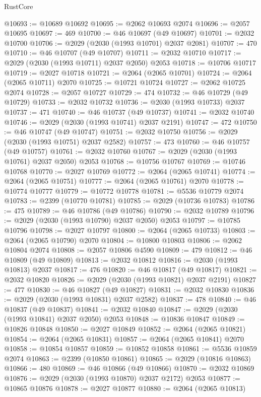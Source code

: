 \begin{lexlean}{RustCore}
\begin{coremodule}
@10693 := @10689 @10692
@10695 := @2062 @10693 @2074
@10696 := @2057 @10695
@10697 := 469
@10700 := @46 @10697 (@49 @10697)
@10701 := @2032 @10700
@10706 := @2029 (@2030 (@1993 @10701) @2037 @2081)
@10707 := 470
@10710 := @46 @10707 (@49 @10707)
@10711 := @2032 @10710
@10717 := @2029 (@2030 (@1993 @10711) @2037 @2050) @2053
@10718 := @10706 @10717
@10719 := @2027 @10718
@10721 := @2064 (@2065 @10701)
@10724 := @2064 (@2065 @10711) @2070
@10725 := @10721 @10724
@10727 := @2062 @10725 @2074
@10728 := @2057 @10727
@10729 := 474
@10732 := @46 @10729 (@49 @10729)
@10733 := @2032 @10732
@10736 := @2030 (@1993 @10733) @2037
@10737 := 471
@10740 := @46 @10737 (@49 @10737)
@10741 := @2032 @10740
@10746 := @2029 (@2030 (@1993 @10741) @2037 @2191)
@10747 := 472
@10750 := @46 @10747 (@49 @10747)
@10751 := @2032 @10750
@10756 := @2029 (@2030 (@1993 @10751) @2037 @2582)
@10757 := 473
@10760 := @46 @10757 (@49 @10757)
@10761 := @2032 @10760
@10767 := @2029 (@2030 (@1993 @10761) @2037 @2050) @2053
@10768 := @10756 @10767
@10769 := @10746 @10768
@10770 := @2027 @10769
@10772 := @2064 (@2065 @10741)
@10774 := @2064 (@2065 @10751)
@10777 := @2064 (@2065 @10761) @2070
@10778 := @10774 @10777
@10779 := @10772 @10778
@10781 := @5536 @10779 @2074
@10783 := @2399 (@10770 @10781)
@10785 := @2029 (@10736 @10783)
@10786 := 475
@10789 := @46 @10786 (@49 @10786)
@10790 := @2032 @10789
@10796 := @2029 (@2030 (@1993 @10790) @2037 @2050) @2053
@10797 := @10785 @10796
@10798 := @2027 @10797
@10800 := @2064 (@2065 @10733)
@10803 := @2064 (@2065 @10790) @2070
@10804 := @10800 @10803
@10806 := @2062 @10804 @2074
@10808 := @2057 @10806 @4590
@10809 := 479
@10812 := @46 @10809 (@49 @10809)
@10813 := @2032 @10812
@10816 := @2030 (@1993 @10813) @2037
@10817 := 476
@10820 := @46 @10817 (@49 @10817)
@10821 := @2032 @10820
@10826 := @2029 (@2030 (@1993 @10821) @2037 @2191)
@10827 := 477
@10830 := @46 @10827 (@49 @10827)
@10831 := @2032 @10830
@10836 := @2029 (@2030 (@1993 @10831) @2037 @2582)
@10837 := 478
@10840 := @46 @10837 (@49 @10837)
@10841 := @2032 @10840
@10847 := @2029 (@2030 (@1993 @10841) @2037 @2050) @2053
@10848 := @10836 @10847
@10849 := @10826 @10848
@10850 := @2027 @10849
@10852 := @2064 (@2065 @10821)
@10854 := @2064 (@2065 @10831)
@10857 := @2064 (@2065 @10841) @2070
@10858 := @10854 @10857
@10859 := @10852 @10858
@10861 := @5536 @10859 @2074
@10863 := @2399 (@10850 @10861)
@10865 := @2029 (@10816 @10863)
@10866 := 480
@10869 := @46 @10866 (@49 @10866)
@10870 := @2032 @10869
@10876 := @2029 (@2030 (@1993 @10870) @2037 @2172) @2053
@10877 := @10865 @10876
@10878 := @2027 @10877
@10880 := @2064 (@2065 @10813)

\end{coremodule}
\end{lexlean}
